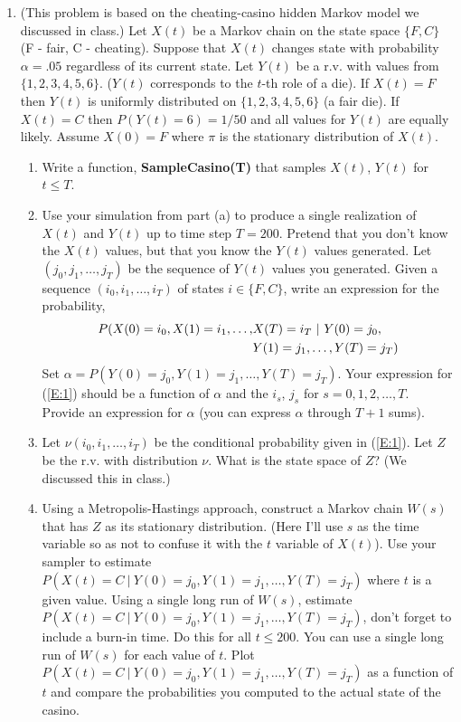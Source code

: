 \documentclass{article}
\begin{document}
\begin{enumerate} 

\item (This problem is based on the cheating-casino hidden Markov model we discussed in class.)  Let $X(t)$ be a Markov chain on the state space $\{F,C\}$ (F - fair, C - cheating).  Suppose that $X(t)$ changes state with probability $\alpha = .05$ regardless of its current state.   Let $Y(t)$ be a r.v. with values from $\{1,2,3,4,5,6\}$.  ($Y(t)$ corresponds to the $t$-th role of a die).     If $X(t) = F$ then $Y(t)$ is uniformly distributed on $\{1,2,3,4,5,6\}$ (a fair die).  If $X(t) = C$ then $P(Y(t) = 6) = 1/50$ and all values for $Y(t)$ are equally likely.   Assume $X(0) = F$ where $\pi$ is the stationary distribution of $X(t)$.  
\begin{enumerate}
\item Write a function, \textbf{SampleCasino(T)} that samples $X(t)$, $Y(t)$ for $t \le T$.
\item Use your simulation from part (a) to produce a single realization of $X(t)$ and $Y(t)$ up to time step $T=200$.   Pretend that you don't know the $X(t)$ values, but that you know the $Y(t)$ values generated. Let $(j_0, j_1, \dots, j_T)$ be the sequence of $Y(t)$ values you generated. Given a sequence $(i_0, i_1, \dots, i_T)$ of states $i \in \{F,C\}$, write an expression for the probability,
\begin{align}  \label{E:1}
P(X(0) = i_0, X(1) = i_1, \dots,& X(T) = i_T \ | \ Y(0) = j_0, 
\\ \notag
	& Y(1) = j_1, \dots, Y(T) = j_T)
\end{align}
Set $\alpha = P(Y(0) = j_0, Y(1) = j_1,\dots, Y(T) = j_T)$.  Your expression for (\ref{E:1}) should be a function of $\alpha$ and the $i_s$, $j_s$ for $s=0,1,2,\dots,T$. Provide an expression for $\alpha$ (you can express $\alpha$ through $T+1$ sums).
\item Let $\nu(i_0, i_1, \dots, i_T)$ be the conditional probability given in (\ref{E:1}).  Let $Z$ be the r.v. with distribution $\nu$.  What is the state space of $Z$?  (We discussed this in class.)
\item Using a Metropolis-Hastings approach, construct a Markov chain $W(s)$ that has $Z$ as its stationary distribution.  (Here I'll use $s$ as the time variable so as not to confuse it with the $t$ variable of $X(t)$).    Use your sampler to estimate $P(X(t) = C \ | \ Y(0) = j_0, Y(1) = j_1,\dots, Y(T) = j_T)$ where $t$ is a given value.  Using a single long run of $W(s)$, estimate $P(X(t) = C \ | \ Y(0) = j_0, Y(1) = j_1,\dots, Y(T) = j_T)$, don't forget to include a burn-in time.  Do this for all $t \le 200$. You can use a single long run of $W(s)$ for each value of $t$.  Plot $P(X(t) = C \ | \ Y(0) = j_0, Y(1) = j_1,\dots, Y(T) = j_T)$ as a function of $t$ and compare the probabilities you computed to the actual state of the casino.
\end{enumerate}


\end{enumerate}
\end{document}

